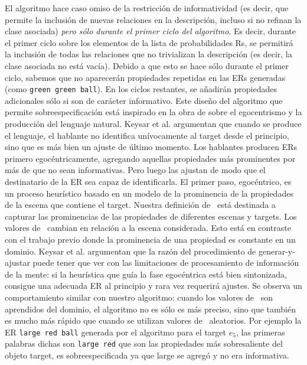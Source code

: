 El algoritmo hace caso omiso de la restricci\'on de informatividad (es decir, que permite la inclusi\'on de nuevas relaciones
en la descripci\'on, incluso si no refinan la clase asociada) \emph{pero s\'olo durante el
primer ciclo del algoritmo}. Es decir, durante el primer ciclo sobre los elementos de la
lista de probabilidades Rs, se permitir\'a la inclusi\'on de todas las relaciones que no trivializan la
descripci\'on (es decir, la clase asociada no est\'a vac\'{i}a). Debido a que esto se hace s\'olo durante
el primer ciclo, sabemos que no aparecer\'an propiedades repetidas en las ERs generadas (como \texttt{green green ball}).
En los ciclos restantes, se a\~nadir\'an propiedades adicionales s\'olo si son de car\'acter informativo.
Este dise\~no del algoritmo que permite sobreespecificaci\'on est\'a inspirado en la obra de \cite{keysar:Curr98} sobre el egocentrismo y la producci\'on del lenguaje natural. Keysar et al. argumentan que cuando se produce el lenguaje, el hablante no identifica un\'ivocamente al target desde el principio, sino que  
es m\'as bien un ajuste de \'ultimo momento. Los hablantes producen ERs primero egoc\'entricamente, agregando aquellas propiedades m\'as prominentes por m\'as de que no sean informativas. Pero luego las ajustan de modo que el destinatario de la ER sea capaz de identificarla. El primer paso, egoc\'entrico, es un proceso
heur\'istico basado en un modelo de la prominencia de la propiedades de la escena que contiene el target. Nuestra definici\'on de
\puse\ est\'a destinada a capturar las prominencias de las propiedades de diferentes escenas y targets. Los valores de \puse\
cambian en relaci\'on a la escena considerada. Esto est\'a en contraste con el trabajo previo donde
la prominencia de una propiedad es constante en un dominio. Keysar et al. argumentan que la raz\'on del procedimiento de 
generar-y-ajustar puede tener que ver con las limitaciones de procesamiento de informaci\'on de la
mente: si la heur\'istica que gu\'ia la fase egoc\'entrica est\'a bien sintonizada, consigue una adecuada ER al principio
y rara vez requerir\'a ajustes. Se observa un comportamiento similar
con nuestro algoritmo: cuando los valores de \puse\ son
aprendidos del dominio, el algoritmo no es
s\'olo es m\'as preciso, sino que tambi\'en es mucho m\'as r\'apido que cuando se utilizan valores de \puse\ aleatorios. Por ejemplo la ER \texttt{large red ball} generada por el algoritmo para el target $e_5$, las primeras palabras dichas son \texttt{large red} que son las propiedades m\'as sobresaliente del objeto target, es sobreespecificada ya que large se agreg\'o y no era informativa. 


